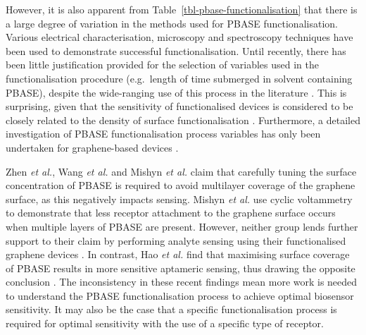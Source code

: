 \documentclass[
  a4paper,
]{scrbook}
\begin{document}
However, it is also apparent from
Table~\ref{tbl-pbase-functionalisation} that there is a large degree of
variation in the methods used for PBASE functionalisation. Various
electrical characterisation, microscopy and spectroscopy techniques have
been used to demonstrate successful functionalisation. Until recently,
there has been little justification provided for the selection of
variables used in the functionalisation procedure (e.g.~length of time
submerged in solvent containing PBASE), despite the wide-ranging use of
this process in the literature \autocite{Hinnemo2017,Zhen2018,Wang2020}.
This is surprising, given that the sensitivity of functionalised devices
is considered to be closely related to the density of surface
functionalisation \autocite{White2008,Hermanson2013-3,Chen2014}.
Furthermore, a detailed investigation of PBASE functionalisation process
variables has only been undertaken for graphene-based devices
\autocite{Zhen2018,Hao2020,Wang2020,Mishyn2022}.

Zhen \emph{et al.}, Wang \emph{et al.} and Mishyn \emph{et al.} claim
that carefully tuning the surface concentration of PBASE is required to
avoid multilayer coverage of the graphene surface, as this negatively
impacts sensing. Mishyn \emph{et al.} use cyclic voltammetry to
demonstrate that less receptor attachment to the graphene surface occurs
when multiple layers of PBASE are present. However, neither group lends
further support to their claim by performing analyte sensing using their
functionalised graphene devices \autocite{Zhen2018,Mishyn2022}. In
contrast, Hao \emph{et al.} find that maximising surface coverage of
PBASE results in more sensitive aptameric sensing, thus drawing the
opposite conclusion \autocite{Hao2020}. The inconsistency in these
recent findings mean more work is needed to understand the PBASE
functionalisation process to achieve optimal biosensor sensitivity. It
may also be the case that a specific functionalisation process is
required for optimal sensitivity with the use of a specific type of
receptor.
\end{document}
